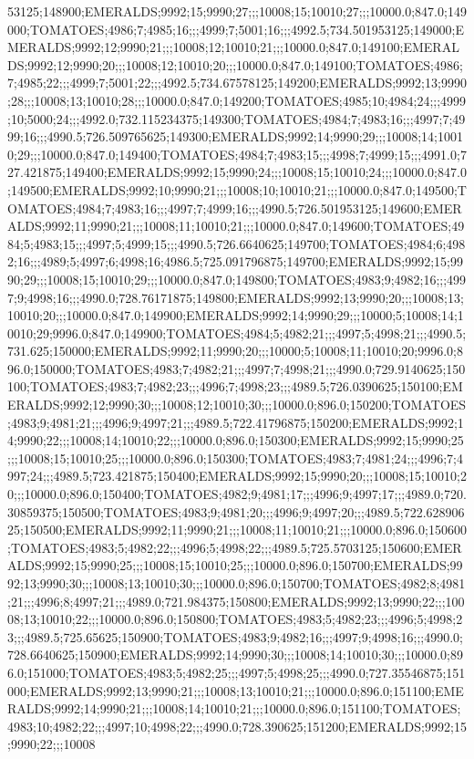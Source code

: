 53125;148900;EMERALDS;9992;15;9990;27;;;10008;15;10010;27;;;10000.0;847.0;149000;TOMATOES;4986;7;4985;16;;;4999;7;5001;16;;;4992.5;734.501953125;149000;EMERALDS;9992;12;9990;21;;;10008;12;10010;21;;;10000.0;847.0;149100;EMERALDS;9992;12;9990;20;;;10008;12;10010;20;;;10000.0;847.0;149100;TOMATOES;4986;7;4985;22;;;4999;7;5001;22;;;4992.5;734.67578125;149200;EMERALDS;9992;13;9990;28;;;10008;13;10010;28;;;10000.0;847.0;149200;TOMATOES;4985;10;4984;24;;;4999;10;5000;24;;;4992.0;732.115234375;149300;TOMATOES;4984;7;4983;16;;;4997;7;4999;16;;;4990.5;726.509765625;149300;EMERALDS;9992;14;9990;29;;;10008;14;10010;29;;;10000.0;847.0;149400;TOMATOES;4984;7;4983;15;;;4998;7;4999;15;;;4991.0;727.421875;149400;EMERALDS;9992;15;9990;24;;;10008;15;10010;24;;;10000.0;847.0;149500;EMERALDS;9992;10;9990;21;;;10008;10;10010;21;;;10000.0;847.0;149500;TOMATOES;4984;7;4983;16;;;4997;7;4999;16;;;4990.5;726.501953125;149600;EMERALDS;9992;11;9990;21;;;10008;11;10010;21;;;10000.0;847.0;149600;TOMATOES;4984;5;4983;15;;;4997;5;4999;15;;;4990.5;726.6640625;149700;TOMATOES;4984;6;4982;16;;;4989;5;4997;6;4998;16;4986.5;725.091796875;149700;EMERALDS;9992;15;9990;29;;;10008;15;10010;29;;;10000.0;847.0;149800;TOMATOES;4983;9;4982;16;;;4997;9;4998;16;;;4990.0;728.76171875;149800;EMERALDS;9992;13;9990;20;;;10008;13;10010;20;;;10000.0;847.0;149900;EMERALDS;9992;14;9990;29;;;10000;5;10008;14;10010;29;9996.0;847.0;149900;TOMATOES;4984;5;4982;21;;;4997;5;4998;21;;;4990.5;731.625;150000;EMERALDS;9992;11;9990;20;;;10000;5;10008;11;10010;20;9996.0;896.0;150000;TOMATOES;4983;7;4982;21;;;4997;7;4998;21;;;4990.0;729.9140625;150100;TOMATOES;4983;7;4982;23;;;4996;7;4998;23;;;4989.5;726.0390625;150100;EMERALDS;9992;12;9990;30;;;10008;12;10010;30;;;10000.0;896.0;150200;TOMATOES;4983;9;4981;21;;;4996;9;4997;21;;;4989.5;722.41796875;150200;EMERALDS;9992;14;9990;22;;;10008;14;10010;22;;;10000.0;896.0;150300;EMERALDS;9992;15;9990;25;;;10008;15;10010;25;;;10000.0;896.0;150300;TOMATOES;4983;7;4981;24;;;4996;7;4997;24;;;4989.5;723.421875;150400;EMERALDS;9992;15;9990;20;;;10008;15;10010;20;;;10000.0;896.0;150400;TOMATOES;4982;9;4981;17;;;4996;9;4997;17;;;4989.0;720.30859375;150500;TOMATOES;4983;9;4981;20;;;4996;9;4997;20;;;4989.5;722.62890625;150500;EMERALDS;9992;11;9990;21;;;10008;11;10010;21;;;10000.0;896.0;150600;TOMATOES;4983;5;4982;22;;;4996;5;4998;22;;;4989.5;725.5703125;150600;EMERALDS;9992;15;9990;25;;;10008;15;10010;25;;;10000.0;896.0;150700;EMERALDS;9992;13;9990;30;;;10008;13;10010;30;;;10000.0;896.0;150700;TOMATOES;4982;8;4981;21;;;4996;8;4997;21;;;4989.0;721.984375;150800;EMERALDS;9992;13;9990;22;;;10008;13;10010;22;;;10000.0;896.0;150800;TOMATOES;4983;5;4982;23;;;4996;5;4998;23;;;4989.5;725.65625;150900;TOMATOES;4983;9;4982;16;;;4997;9;4998;16;;;4990.0;728.6640625;150900;EMERALDS;9992;14;9990;30;;;10008;14;10010;30;;;10000.0;896.0;151000;TOMATOES;4983;5;4982;25;;;4997;5;4998;25;;;4990.0;727.35546875;151000;EMERALDS;9992;13;9990;21;;;10008;13;10010;21;;;10000.0;896.0;151100;EMERALDS;9992;14;9990;21;;;10008;14;10010;21;;;10000.0;896.0;151100;TOMATOES;4983;10;4982;22;;;4997;10;4998;22;;;4990.0;728.390625;151200;EMERALDS;9992;15;9990;22;;;10008
